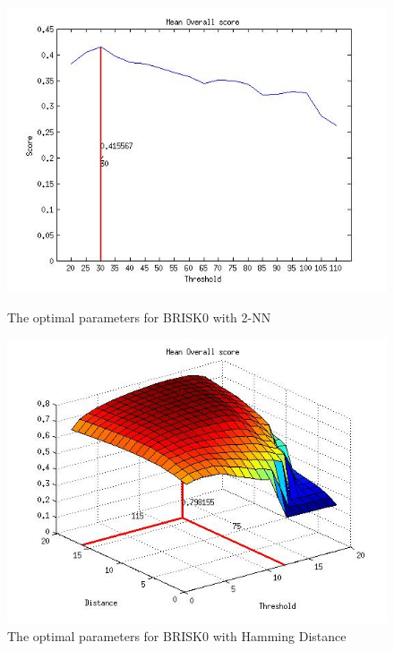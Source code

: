 \documentclass[11pt]{report}
\begin{document}
\begin{figure}
\begin{minipage}[b]{0.5\linewidth}
\includegraphics[scale=0.4]{../Drawings/OptimalParameters_SBRISK_SBRISK_KNN.jpg}
\caption{The optimal parameters for BRISK0 with 2-NN}
\label{fig:BRISK0knnOptimal}
\end{minipage}
\hspace{0.5cm}
\begin{minipage}[b]{0.5\linewidth}
\includegraphics[scale=0.4]{../Drawings/OptimalParameters_SBRISK_SBRISK_hamming.jpg}
\caption{The optimal parameters for BRISK0 with Hamming Distance}
\label{fig:BRISK0hammingOptimal}
\end{minipage}

\end{figure}
\end{document}
